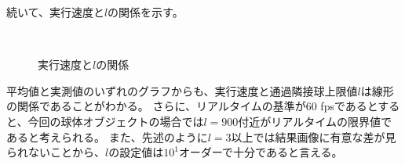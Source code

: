 続いて、実行速度と$l$の関係を示す。
\begin{figure}[htbp]
  \centering
{}\\
  \caption{実行速度と$l$の関係}
  \label{FExetimeAndL}
\end{figure}
平均値と実測値のいずれのグラフからも、実行速度と通過隣接球上限値$l$は線形の関係であることがわかる。
さらに、リアルタイムの基準が60 fpsであるとすると、今回の球体オブジェクトの場合では$l=900$付近がリアルタイムの限界値であると考えられる。
また、先述のように$l=3$以上では結果画像に有意な差が見られないことから、$l$の設定値は$10^1$オーダーで十分であると言える。



